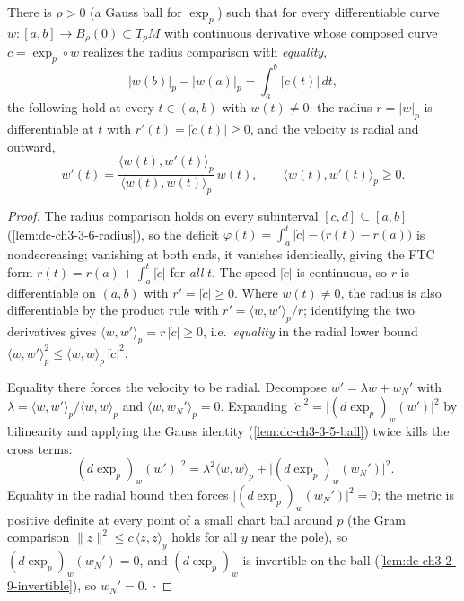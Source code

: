 \begin{lemma}
  \label{lem:dc-ch3-3-6-equality-radial}
  \leanok
  There is $\rho>0$ (a Gauss ball for $\exp_p$) such that for every
  differentiable curve $w:[a,b]\to B_\rho(0)\subset T_pM$ with continuous
  derivative whose composed curve $c=\exp_p\circ w$ realizes the radius
  comparison with \emph{equality},
  $$|w(b)|_p-|w(a)|_p=\int_a^b|\dot c(t)|\,dt,$$
  the following hold at every $t\in(a,b)$ with $w(t)\neq0$: the radius
  $r=|w|_p$ is differentiable at $t$ with $r'(t)=|\dot c(t)|\ge0$, and the
  velocity is radial and outward,
  $$w'(t)=\frac{\langle w(t),w'(t)\rangle_p}{\langle w(t),w(t)\rangle_p}\,
    w(t),\qquad\langle w(t),w'(t)\rangle_p\ge0.$$
\end{lemma}
\begin{proof}
  \leanok
  The radius comparison holds on every subinterval $[c,d]\subseteq[a,b]$
  (\cref{lem:dc-ch3-3-6-radius}), so the deficit
  $\varphi(t)=\int_a^t|\dot c|-\big(r(t)-r(a)\big)$ is nondecreasing;
  vanishing at both ends, it vanishes identically, giving the FTC form
  $r(t)=r(a)+\int_a^t|\dot c|$ for \emph{all} $t$. The speed $|\dot c|$ is
  continuous, so $r$ is differentiable on $(a,b)$ with $r'=|\dot c|\ge0$.
  Where $w(t)\neq0$, the radius is also differentiable by the product rule
  with $r'=\langle w,w'\rangle_p/r$; identifying the two derivatives gives
  $\langle w,w'\rangle_p=r\,|\dot c|\ge0$, i.e.\ \emph{equality} in the
  radial lower bound
  $\langle w,w'\rangle_p^2\le\langle w,w\rangle_p\,|\dot c|^2$.

  Equality there forces the velocity to be radial. Decompose
  $w'=\lambda w+w_N'$ with
  $\lambda=\langle w,w'\rangle_p/\langle w,w\rangle_p$ and
  $\langle w,w_N'\rangle_p=0$. Expanding
  $|\dot c|^2=\big|(d\exp_p)_w(w')\big|^2$ by bilinearity and applying the
  Gauss identity (\cref{lem:dc-ch3-3-5-ball}) twice kills the cross terms:
  $$\big|(d\exp_p)_w(w')\big|^2
    =\lambda^2\langle w,w\rangle_p+\big|(d\exp_p)_w(w_N')\big|^2.$$
  Equality in the radial bound then forces
  $\big|(d\exp_p)_w(w_N')\big|^2=0$; the metric is positive definite at
  every point of a small chart ball around $p$ (the Gram comparison
  $\|z\|^2\le c\,\langle z,z\rangle_y$ holds for all $y$ near the pole), so
  $(d\exp_p)_w(w_N')=0$, and $(d\exp_p)_w$ is invertible on the ball
  (\cref{lem:dc-ch3-2-9-invertible}), so $w_N'=0$. $\square$
\end{proof}

